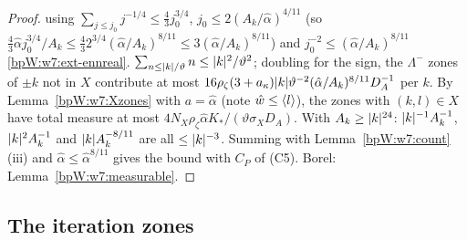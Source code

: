 \begin{proof}
using $\sum_{j\le j_0}j^{-1/4}\le\frac43j_0^{3/4}$, $j_0\le2(A_k/\hat\alpha)^{4/11}$ (so
$\frac43\hat\alpha j_0^{3/4}/A_k\le\frac43 2^{3/4}(\hat\alpha/A_k)^{8/11}\le3(\hat\alpha/A_k)^{8/11}$) and
$j_0^{-2}\le(\hat\alpha/A_k)^{8/11}$
\ref{bpW:w7:ext-ennreal}.
\label{stepW:w7:prep-n}
$\sum_{n\le\lvert k\rvert/\vartheta}n\le\lvert k\rvert^2/\vartheta^2$; doubling for the sign, the $\Lambda^-$ zones of $\pm k$ not in
$X$ contribute at most $16\rho_\zeta(3+a_\kappa)\lvert k\rvert\vartheta^{-2}(\hat\alpha/A_k)^{8/11}D_A^{-1}$ per $k$.
\label{stepW:w7:prep-X}
By Lemma~\ref{bpW:w7:Xzones} with $a=\hat\alpha$ (note $\hat w\le\langle l\rangle$), the zones with $(k,l)\in X$ have total
measure at most $4N_X\rho_\zeta\hat\alpha K_*/(\vartheta\sigma_XD_A)$.
\label{stepW:w7:prep-sum}
With $A_k\ge\lvert k\rvert^{24}$: $\lvert k\rvert^{-1}A_k^{-1}$, $\lvert k\rvert^2A_k^{-1}$ and $\lvert k\rvert A_k^{-8/11}$ are all $\le\lvert k\rvert^{-3}$.
Summing with Lemma~\ref{bpW:w7:count}(iii) and $\hat\alpha\le\hat\alpha^{8/11}$ gives the bound with $C_P$ of (C5).
Borel: Lemma~\ref{bpW:w7:measurable}.
\end{proof}

\subsection{The iteration zones}\label{bpW:w7:iter-sec}

